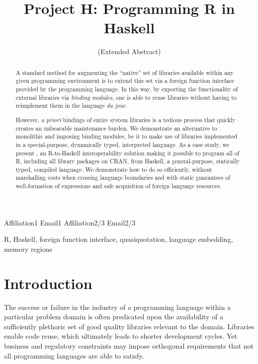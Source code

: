 \documentclass[preprint,authoryear]{sigplanconf}
\begin{document}

\exclusivelicense

\title{Project H: Programming R in Haskell}
\subtitle{(Extended Abstract)}

           {Affiliation1}
           {Email1}
           {Affiliation2/3}
           {Email2/3}

\maketitle

\begin{abstract}
  A standard method for augmenting the ``native'' set of libraries
  available within any given programming environment is to extend this
  set via a foreign function interface provided by the programming
  language. In this way, by exporting the functionality of external
  libraries via {\em binding modules}, one is able to reuse libraries
  without having to reimplement them in the language {\em du jour}.

  However, {\em a priori} bindings of entire system libraries is
  a tedious process that quickly creates an unbearable maintenance
  burden. We demonstrate an alternative to monolithic and imposing
  binding modules, be it to make use of libraries implemented in
  a special-purpose, dynamically typed, interpreted language. As
  a case study, we present \SysH, an R-to-Haskell interoperability
  solution making it possible to program all of R, including all
  library packages on CRAN, from Haskell, a general-purpose,
  statically typed, compiled language. We demonstrate how to do so
  efficiently, without marshalling costs when crossing language
  boundaries and with static guarantees of well-formation of
  expressions and safe acquisition of foreign language resources.
\end{abstract}


\keywords R, Haskell, foreign function interface, quasiquotation,
language embedding, memory regions

\section{Introduction}
  
The success or failure in the industry of a programming language
within a particular problem domain is often predicated upon the
availability of a sufficiently plethoric set of good quality libraries
relevant to the domain. Libraries enable code reuse, which ultimately
leads to shorter development cycles. Yet business and regulatory
constraints may impose orthogonal requirements that not all
programming languages are able to satisfy.
\end{document}
